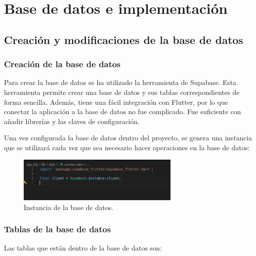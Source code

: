 \chapter{Base de datos e implementación}
\label{chap:implementación}


\section{Creación y modificaciones de la base de datos}

\subsection{Creación de la base de datos}

Para crear la base de datos se ha utilizado la herramienta de Supabase. Esta herramienta permite crear una base de datos y sus tablas correspondientes de forma sencilla. Además, tiene una fácil integración con Flutter, por lo que conectar la aplicación a la base de datos no fue complicado. Fue suficiente con añadir librerías y las claves de configuración.  

Una vez configurada la base de datos dentro del proyecto, se genera una instancia que se utilizará cada vez que sea necesario hacer operaciones en la base de datos: 

\begin{figure}[H]
	\centering
	\includegraphics[width=0.7\textwidth]{imagenes/clientBD.png}
	\caption{Instancia de la base de datos.}
	\label{fig:instanciaBD}
\end{figure}

\newpage

\subsection{Tablas de la base de datos}

Las tablas que están dentro de la base de datos son: 


